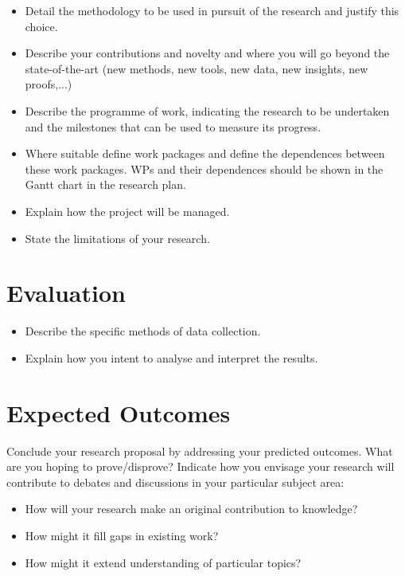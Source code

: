 \documentclass[a4paper,11pt]{article}
\begin{document}
\begin{itemize}
    \item Detail the methodology to be used in pursuit of the research and justify this choice.
    \item Describe your contributions and novelty and where you
    will go beyond the state-of-the-art (new methods, new tools,
    new data, new insights, new proofs,...)
    \item Describe the programme of work, indicating the research to be undertaken and the milestones that can be used to measure its progress.
    \item Where suitable define work packages and define the dependences
    between these work packages. WPs and their dependences should be
    shown in the Gantt chart in the research plan.
    \item Explain how the project will be managed.
    \item State the limitations of your research.
\end{itemize}

\section{Evaluation}

\begin{itemize}
    \item Describe the specific methods of data collection.
    \item Explain how you intent to analyse and interpret the results.
\end{itemize}

\section{Expected Outcomes}

Conclude your research proposal by addressing your predicted outcomes. What are you hoping to prove/disprove? Indicate how you envisage your research will contribute to debates and discussions in your particular subject area:

\begin{itemize}
    \item How will your research make an original contribution to knowledge?
    \item How might it fill gaps in existing work? 
    \item How might it extend understanding of particular topics?
\end{itemize}
\end{document}
